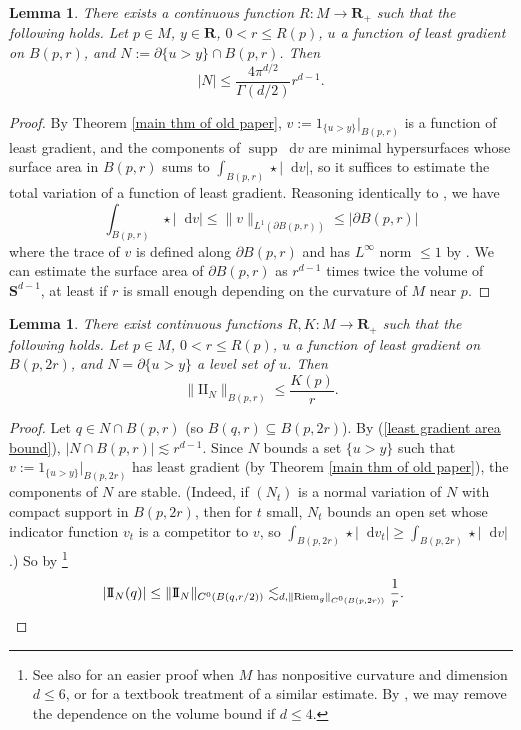 \documentclass[reqno,11pt]{amsart}
\newcommand{\RR}{\mathbf{R}}
\newcommand{\Sph}{\mathbf S}
\newcommand*\dif{\mathop{}\!\mathrm{d}}
\DeclareMathOperator{\supp}{supp}
\newcommand{\Two}{\mathrm{I\!I}}
\newcommand{\Riem}{\mathrm{Riem}}
\newtheorem{lemma}[theorem]{Lemma}
\theoremstyle{definition}
\numberwithin{equation}{section}
\begin{document}
\begin{lemma}
There exists a continuous function $R: M \to \RR_+$ such that the following holds.
Let $p \in M$, $y \in \RR$, $0 < r \leq R(p)$, $u$ a function of least gradient on $B(p, r)$, and $N := \partial \{u > y\} \cap B(p, r)$.
Then 
\begin{equation}\label{least gradient area bound}
|N| \leq \frac{4\pi^{d/2}}{\Gamma(d/2)} r^{d - 1}.
\end{equation}
\end{lemma}
\begin{proof}
By Theorem \ref{main thm of old paper}, $v := 1_{\{u > y\}}|_{B(p, r)}$ is a function of least gradient, and the components of $\supp \dif v$ are minimal hypersurfaces whose surface area in $B(p, r)$ sums to $\int_{B(p, r)} \star |\dif v|$, so it suffices to estimate the total variation of a function of least gradient.
Reasoning identically to \cite[Lemma 5.6]{Giusti77}, we have 
$$\int_{B(p, r)} \star |\dif v| \leq \|v\|_{L^1(\partial B(p, r))} \leq |\partial B(p, r)|$$
where the trace of $v$ is defined along $\partial B(p, r)$ and has $L^\infty$ norm $\leq 1$ by \cite[Theorem 2.10]{Giusti77}.
We can estimate the surface area of $\partial B(p, r)$ as $r^{d - 1}$ times twice the volume of $\Sph^{d - 1}$, at least if $r$ is small enough depending on the curvature of $M$ near $p$.
\end{proof}

\begin{lemma}\label{choose balls for main thm}
There exist continuous functions $R, K: M \to \RR_+$ such that the following holds.
Let $p \in M$, $0 < r \leq R(p)$, $u$ a function of least gradient on $B(p, 2r)$, and $N = \partial \{u > y\}$ a level set of $u$.
Then
\begin{equation}\label{least gradient curvature bound}
\|\Two_N\|_{B(p, r)} \leq \frac{K(p)}{r}.
\end{equation}
\end{lemma}
\begin{proof}
Let $q \in N \cap B(p, r)$ (so $B(q, r) \subseteq B(p, 2r)$).
By (\ref{least gradient area bound}), $|N \cap B(p, r)| \lesssim r^{d - 1}$.
Since $N$ bounds a set $\{u > y\}$ such that $v := 1_{\{u > y\}}|_{B(p, 2r)}$ has least gradient (by Theorem \ref{main thm of old paper}), the components of $N$ are stable.
(Indeed, if $(N_t)$ is a normal variation of $N$ with compact support in $B(p, 2r)$, then for $t$ small, $N_t$ bounds an open set whose indicator function $v_t$ is a competitor to $v$, so $\int_{B(p, 2r)} \star |\dif v_t| \geq \int_{B(p, 2r)} \star |\dif v|$.)
So by \cite[pg785, Corollary 1]{Schoen81}\footnote{See also \cite[Theorem 3]{Schoen75} for an easier proof when $M$ has nonpositive curvature and dimension $d \leq 6$, or \cite[Chapter 2, \S\S4-5]{colding2011course} for a textbook treatment of a similar estimate. By \cite[Lemma 2.4]{chodosh2022complete}, we may remove the dependence on the volume bound if $d \leq 4$.}
\begin{align*}
|\Two_N(q)| &\leq \|\Two_N\|_{C^0(B(q, r/2))} \lesssim_{d, \|\Riem_g\|_{C^0(B(p, 2r))}} \frac{1}{r}. \qedhere 
\end{align*}
\end{proof}
\end{document}
